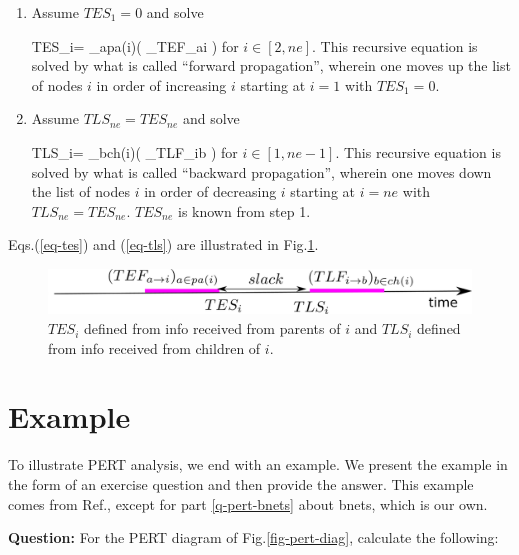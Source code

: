 \begin{enumerate}
\item Assume $TES_1=0$ and solve

\beq
TES_i= \max_{a\in pa(i)}(
_{TEF_{a\rarrow i}}
)
\;
\label{eq-tes}
\eeq
for $i\in [2, ne]$.
This recursive equation is solved
by what is called
\enquote{forward propagation},
wherein one 
moves up the list of
nodes $i$ in order 
of increasing 
$i$
starting at $i=1$ with $TES_1=0$.

\item Assume $TLS_{ne}=TES_{ne}$ and solve

\beq
TLS_i= \min_{b\in ch(i)}(
_{TLF_{i\rarrow b}}
)
\;
\label{eq-tls}
\eeq
for $i\in [1, ne-1]$. This recursive
equation is solved
by what is called
\enquote{backward propagation},
wherein one 
moves down the list of
nodes $i$ in order 
of decreasing 
$i$
starting at $i=ne$ with $TLS_{ne}=TES_{ne}$.
$TES_{ne}$ is known from step 1.
\end{enumerate}
Eqs.(\ref{eq-tes}) and (\ref{eq-tls})
are illustrated in Fig.\ref{fig-pert-t-interval}.



\begin{figure}[h!]
\centering
\includegraphics[width=6in]{pert/pert.png}
\caption{
$TES_i$ 
defined from info received
from parents of  $i$
and  $TLS_i$
defined from info received 
from children of $i$.} 
\label{fig-pert-t-interval}
\end{figure}

\section{Example}
To illustrate PERT analysis, we end 
with an example. We present the 
example
in the form of an exercise question and then
provide the answer. This example
comes from Ref.\cite{ibook},
except for part \ref{q-pert-bnets} 
about bnets, which is our own.

{\bf Question:}
For the PERT diagram of Fig.\ref{fig-pert-diag},
calculate the following:


